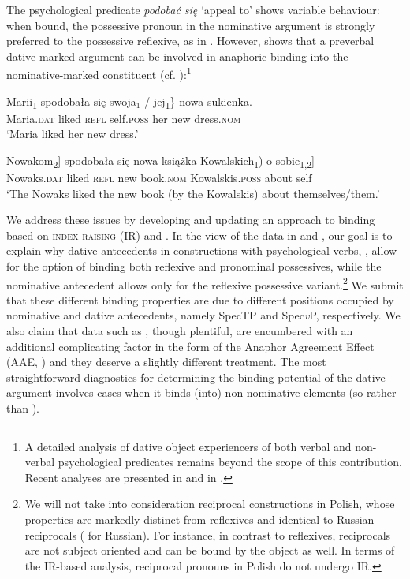 \documentclass[output=paper,modfonts,nonflat
]{langsci/langscibook}
\begin{document}
\noindent The psychological predicate \textit{podobać się} ‘appeal to’ shows variable behaviour: when bound, the possessive pronoun in the nominative argument is strongly preferred to the possessive reflexive, as in . However, \cite{witkos2007,witkos2008} shows that a preverbal dative-marked argument can be involved in anaphoric binding into the nominative-marked constituent (cf. ):\footnote{\label{fn1}A detailed analysis of dative object experiencers of both verbal and non-verbal psychological predicates remains beyond the scope of this contribution. Recent analyses are presented in \cite{jimenezfernandez2016} and in \cite{bondaruk2017}.}




\ea \label{ex:witkos:3}
    \gll Marii\textsubscript{1} spodobała się  swoja$_1$ / jej\textsubscript{1}\}  nowa sukienka.\\
         Maria.\textsc{dat} liked \textsc{refl} {} self.\textsc{poss} {} her new dress.\textsc{nom}\\
    \glt `Maria liked her new dress.'
\z

\ea \label{ex:witkos:4}
    \gll \minsp{[} Nowakom\textsubscript{2}]   spodobała   się   \minsp{[} nowa książka  \minsp{(} Kowalskich\textsubscript{1}) o sobie\textsubscript{1,2}]\\
        {} Nowaks.\textsc{dat} liked \textsc{refl} {} new book.\textsc{nom} {} Kowalskis.\textsc{poss} about self\\
    \glt `The Nowaks liked the new book (by the Kowalskis) about themselves/them.'
\z

\noindent We address these issues by developing and updating an approach to binding based on  \textsc{index raising} (IR) and \cite{despic2013,despic2015}. In the view of the data in  and , our goal is to explain why dative antecedents in constructions with psychological verbs, , allow for the option of binding both reflexive and pronominal possessives, while the nominative antecedent allows only for the reflexive possessive variant.\footnote{\label{fn2}We will not take into consideration reciprocal constructions in Polish, whose properties are markedly distinct from reflexives and identical to Russian reciprocals (\citealt{willim1989,reinders1991,rappaport1986} for Russian). For instance, in contrast to reflexives, reciprocals are not subject oriented and can be bound by the object as well. In terms of the IR-based analysis, reciprocal pronouns in Polish do not undergo IR.} We submit that these different binding properties are due to different positions occupied by nominative and dative antecedents, namely SpecTP and Spec\textit{v}P, respectively. We also claim that data such as , though plentiful, are encumbered with an additional complicating factor in the form of the Anaphor Agreement Effect (AAE, \citealt{rizzi1990,progovac1992,progovac1993,woolford1999,reuland2011}) and they deserve a slightly different treatment. The most straightforward diagnostics for determining the binding potential of the dative argument involves cases when it binds (into) non-nominative elements (so  rather than ).
\end{document}
